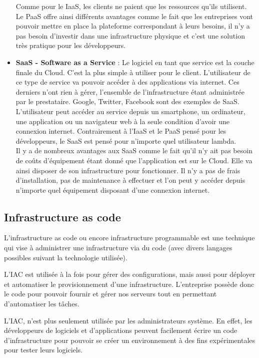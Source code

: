 \documentclass[]{article}
\begin{document}
\begin{itemize}
Comme pour le IaaS, les clients ne paient que les ressources qu'ils utilisent.
Le PaaS offre ainsi différents avantages comme le fait que les entreprises vont pouvoir mettre en place la plateforme correspondant à leurs besoins, il n'y a pas besoin d'investir dans une infrastructure physique et c'est une solution très pratique pour les développeurs.
\item \textbf{SaaS - Software as a Service} : Le logiciel en tant que service est la couche finale du Cloud. C'est la plus simple à utiliser pour le client. L'utilisateur de ce type de service va pouvoir accéder à des applications via internet. Ces derniers n'ont rien à gérer, l'ensemble de l'infrastructure étant administrée par le prestataire. Google, Twitter, Facebook sont des exemples de SaaS. L'utilisateur peut accéder au service depuis un smartphone, un ordinateur, une application ou un navigateur web à la seule condition d'avoir une connexion internet. Contrairement à l'IaaS et le PaaS pensé pour les développeurs, le SaaS est pensé pour n'importe quel utilisateur lambda.\\
Il y a de nombreux avantages aux SaaS comme le fait qu'il n'y ait pas besoin de coûts d'équipement étant donné que l'application est sur le Cloud. Elle va ainsi disposer de son infrastructure pour fonctionner. Il n'y a pas de frais d'installation, pas de maintenance à effectuer et l'on peut y accéder depuis n'importe quel équipement disposant d'une connexion internet.
\end{itemize}
\subsection{Infrastructure as code}\label{infrastructure-as-code}
L'infrastructure as code ou encore \og infrastructure programmable \fg est
une technique qui vise à administrer une infrastructure via du code (avec divers langages possibles suivant la technologie utilisée).

L'IAC est utilisée à la fois pour gérer des configurations, mais aussi pour déployer et automatiser le
provisionnement d'une infrastructure. L'entreprise possède donc le code
pour pouvoir fournir et gérer nos serveurs tout en permettant
d'automatiser les tâches.

L'IAC, n'est plus seulement utilisée par les administrateurs système. En effet, les développeurs de logiciels et d'applications
peuvent facilement écrire un code d'infrastructure pour pouvoir se créer
un environnement à des fins expérimentales pour tester leurs logiciels.
\end{document}
